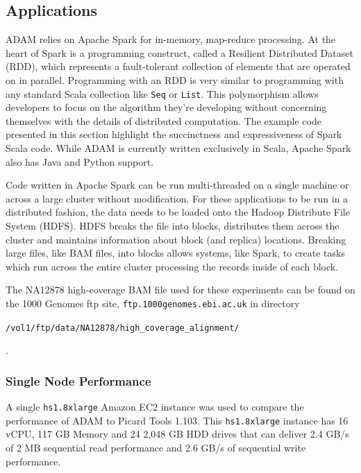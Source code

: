 \documentclass[10pt,twocolumn]{article}
\theoremstyle{plain}
\begin{document}
\subsection{Applications}
\label{sec:applications}

ADAM relies on Apache Spark for in-memory, map-reduce processing. At the heart of Spark is a programming construct,
called a Resilient Distributed Dataset (RDD), which represents a fault-tolerant collection of elements that are
operated on in parallel. Programming with an RDD is very similar to programming with any standard Scala collection
like \texttt{Seq} or \texttt{List}. This polymorphism allows developers to focus on the algorithm they're developing 
without concerning themselves with the details of distributed computation. The example code presented in this section
highlight the succinctness and expressiveness of Spark Scala code. While ADAM is currently written exclusively in 
Scala, Apache Spark also has Java and Python support.

Code written in Apache Spark can be run multi-threaded on a single machine or across a large cluster without modification.
For these applications to be run in a distributed fashion, the data needs to be loaded onto the Hadoop
Distribute File System (HDFS). HDFS breaks the file into blocks, distributes them across the cluster and maintains
information about block (and replica) locations. Breaking large files, like BAM files, into blocks allows systems,
like Spark, to create tasks which run across the entire cluster processing the records inside of each block. 

The NA12878 high-coverage BAM file used for these experiments can be found on the 1000 Genomes ftp site, 
\texttt{ftp.1000genomes.ebi.ac.uk} in directory \begin{small}\texttt{/vol1/ftp/data/NA12878/high\_coverage\_alignment/}\end{small}.

\subsubsection{Single Node Performance}

A single \texttt{hs1.8xlarge} Amazon EC2 instance was used to compare the performance of ADAM to Picard Tools 1.103.
This \texttt{hs1.8xlarge} instance has 16 vCPU, 117 GB Memory and 24 2,048 GB HDD drives that can
deliver 2.4 GB/s of 2 MB sequential read performance and 2.6 GB/s of sequential write performance. 
\end{document}
